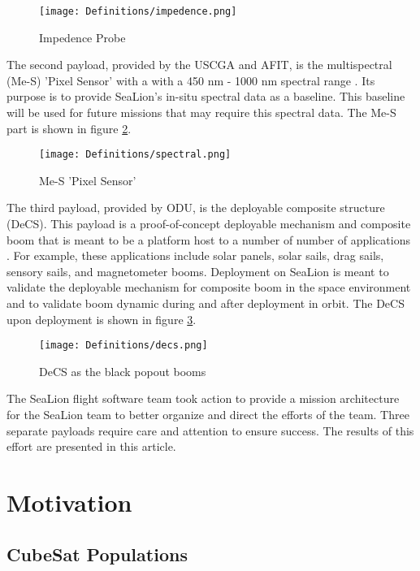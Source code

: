 \documentclass[journal,article,submit,pdftex,moreauthors]{Definitions/mdpi}
\begin{document}
\begin{figure}[H]
    \texttt{[image: Definitions/impedence.png]}
    \caption{Impedence Probe}
	\label{fig:IP}
    \end{figure}
	\noindent   
\unskip

The second payload, provided by the USCGA and AFIT, is the multispectral (Me-S) 'Pixel Sensor' with a with a 450 nm - 1000 nm spectral range \cite{sealion_cdr}.  Its purpose is to provide SeaLion's in-situ spectral data as a baseline.  This baseline will be used for future missions that may require this spectral data.  The Me-S part is shown in figure \ref{fig:Me-S}. 

\begin{figure}[H]
    \texttt{[image: Definitions/spectral.png]}
    \caption{Me-S 'Pixel Sensor'}
	\label{fig:Me-S}
    \end{figure}
	\noindent   
\unskip

The third payload, provided by ODU, is the deployable composite structure (DeCS).  This payload is a proof-of-concept deployable mechanism and composite boom that is meant to be a platform host to a number of number of applications \cite{sealion_cdr}.  For example, these applications include solar panels, solar sails, drag sails, sensory sails, and magnetometer booms.  Deployment on SeaLion is meant to validate the deployable mechanism for composite boom in the space environment and to validate boom dynamic during and after deployment in orbit.  The DeCS upon deployment is shown in figure \ref{fig:DeCS}.

\begin{figure}[H]
    \texttt{[image: Definitions/decs.png]}
    \caption{DeCS as the black popout booms}
	\label{fig:DeCS}
    \end{figure}
	\noindent   
\unskip

The SeaLion flight software team took action to provide a mission architecture for the SeaLion team to better organize and direct the efforts of the team.  Three separate payloads require care and attention to ensure success.  The results of this effort are presented in this article. 

\section{Motivation}
\subsection{CubeSat Populations}
\end{document}
